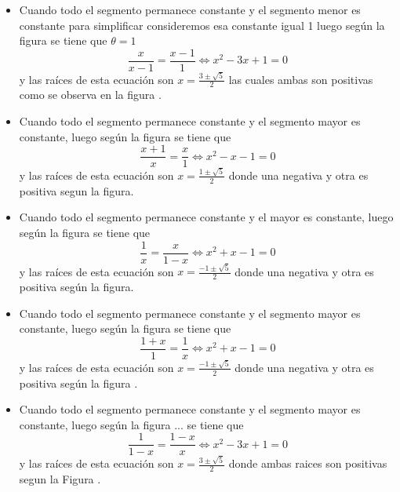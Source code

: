 \begin{itemize}
  \item Cuando todo el segmento permanece constante y el segmento menor es  constante para simplificar consideremos esa constante igual 1 luego según la figura  se tiene que $\theta=1$
        \begin{equation}\label{ecu1}
        \frac{x}{x-1}=\frac{x-1}{1}\Longleftrightarrow x^2-3x+1=0
        \end{equation}
y las raíces   de esta ecuación son $x=\frac{3\pm\sqrt{5}}{2}$ las cuales ambas son positivas como se observa en la figura .

  \item Cuando todo el segmento permanece constante y el segmento mayor es constante, luego según la figura  se tiene que
\begin{equation}\label{ecu3}
\frac{x+1}{x}=\frac{x}{1}\Longleftrightarrow x^2-x-1=0
\end{equation}
y las raíces   de esta ecuación son $x=\frac{1\pm\sqrt{5}}{2}$ donde una negativa y otra es positiva segun la figura.


  \item Cuando todo el segmento permanece constante y el   mayor es constante, luego según la figura se tiene que
\begin{equation}\label{ecu4}
\frac{1}{x}=\frac{x}{1-x}\Longleftrightarrow x^2+x-1=0
\end{equation}
y las raíces   de esta ecuación son $x=\frac{-1\pm\sqrt{5}}{2}$ donde una negativa y otra es positiva según la figura.

  \item Cuando todo el segmento permanece constante y el segmento mayor es constante, luego según la figura  se tiene que
\begin{equation}\label{ecu5}
\frac{1+x}{1}=\frac{1}{x}\Longleftrightarrow x^2+x-1=0
\end{equation}
y las raíces   de esta ecuación son $x=\frac{-1\pm\sqrt{5}}{2}$ donde una negativa y otra es positiva según la figura .



  \item Cuando todo el segmento permanece constante y el segmento mayor es constante, luego según la figura ... se tiene que
\begin{equation}\label{ecu6}
\frac{1}{1-x}=\frac{1-x}{x}\Longleftrightarrow x^2-3x+1=0
\end{equation}
y las raíces   de esta ecuación son $x=\frac{3\pm\sqrt{5}}{2}$ donde ambas raices son positivas segun la Figura .

\end{itemize}


